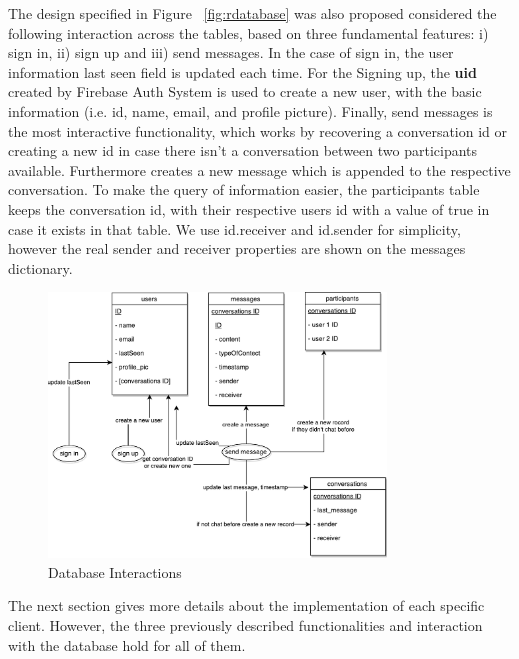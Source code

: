 The design specified in Figure ~\ref{fig:rdatabase} was also proposed considered the following interaction across the tables, based on three fundamental features: i) sign in, ii) sign up and iii) send messages.  In the case of sign in, the user information last seen field is updated each time. For the Signing up, the \textbf{uid} created by Firebase Auth System is used to create a new user, with the basic information (i.e. id, name, email, and profile picture). Finally, send messages is the most interactive functionality, which works by recovering a conversation id or creating a new id in case there isn't a conversation between two participants available. Furthermore creates a new message which is appended to the respective conversation. To make the query of information easier, the participants table keeps the conversation id, with their respective users id with a value of true in case it exists in that table. We use id.receiver and id.sender for simplicity, however the real sender and receiver properties are shown on the messages dictionary.

\begin{figure}[ht]
\centering
\includegraphics[width=0.8\textwidth]{figs/database_interaction}
	\caption{Database Interactions}
	\label{fig:rdatabaseinter}
\end{figure}


The next section gives more details about the implementation of each specific client. However, the three previously described functionalities and interaction with the database hold for all of them. 
